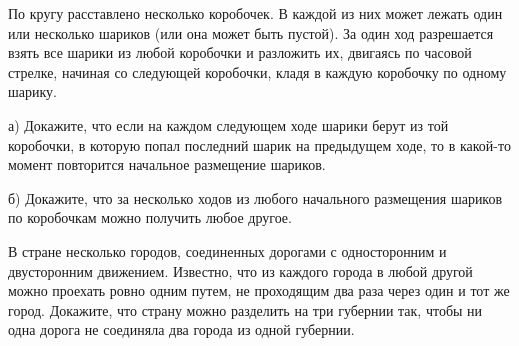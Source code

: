 \begin{exersize}
	По кругу расставлено несколько коробочек. В каждой из них может лежать один или несколько шариков (или она может быть пустой). За один ход  разрешается взять все шарики из любой коробочки и разложить их, двигаясь по часовой стрелке, начиная со следующей коробочки, кладя в каждую коробочку по одному шарику.
	
	а) Докажите, что если на каждом следующем ходе шарики берут из той коробочки, в которую попал последний шарик на предыдущем ходе, то в какой-то момент повторится начальное размещение шариков.
	
	б) Докажите, что за несколько ходов из любого начального размещения шариков по коробочкам можно получить любое другое.
\end{exersize}	

\begin{exersize}
	В стране несколько городов, соединенных дорогами с односторонним и двусторонним движением. Известно, что из каждого города в любой другой можно проехать ровно одним путем, не проходящим два раза через один и тот же город. Докажите, что страну можно разделить на три губернии так, чтобы ни одна дорога не соединяла два города из одной губернии.
\end{exersize}	

